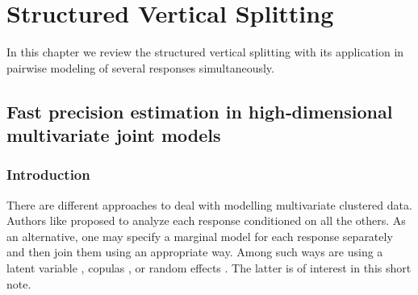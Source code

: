 \documentclass[11pt,a5paper,twoside]{book}
\begin{document}
\chapter{Structured Vertical Splitting}
\label{chap_structured_vertical}
In this chapter we review the structured vertical splitting with its application in pairwise modeling of several responses simultaneously. 

\section[Fast precision estimation]{Fast precision estimation in high‐dimensional multivariate joint models}


\subsection{Introduction}
\label{sec_intro}

There are different approaches to deal with modelling multivariate clustered data. Authors like \cite{pawitan1993} proposed to analyze each response conditioned on all the others. As an alternative, one may specify a marginal model for each response separately and then join them using an appropriate way. Among such ways are using a latent variable \citep{catalano1992}, copulas \citep{nelsen2007}, or random effects \citep{laird1982}. The latter is of interest in this short note. 

\end{document}
